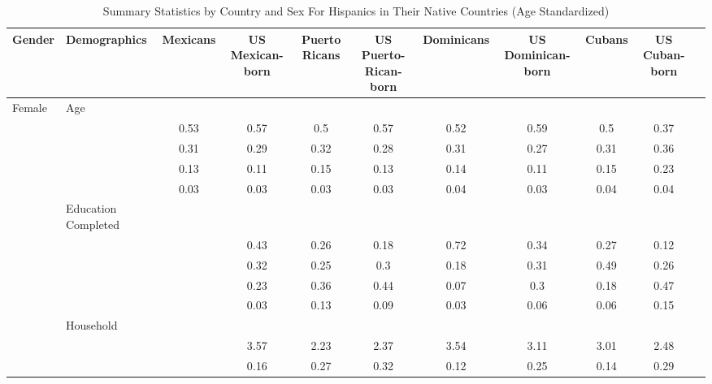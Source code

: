 \documentclass[
]{article}
\begin{document}
\begin{landscape}
\begin{table}[ht]
\centering
\caption{Summary Statistics by Country and Sex For Hispanics in Their Native Countries (Age Standardized)} 
\begingroup\small
\begin{tabular}{l>{\raggedright\arraybackslash}p{3.2cm}|ccccccccc}
  \hline
Gender & Demographics & Mexicans & US Mexican-born & Puerto Ricans & US Puerto-Rican-born & Dominicans & US Dominican-born & Cubans & US Cuban-born \\ 
  \hline
Female & Age &  &  &  &  &  &  &  &  \\ 
   & \multicolumn{1}{>{\raggedleft\arraybackslash}p{1.5cm}|}{\makebox[1.5cm][r]{60 - 69 }} & 0.53 & 0.57 & 0.5 & 0.57 & 0.52 & 0.59 & 0.5 & 0.37 \\ 
   & \multicolumn{1}{>{\raggedleft\arraybackslash}p{1.5cm}|}{\makebox[1.5cm][r]{70 - 79 }} & 0.31 & 0.29 & 0.32 & 0.28 & 0.31 & 0.27 & 0.31 & 0.36 \\ 
   & \multicolumn{1}{>{\raggedleft\arraybackslash}p{1.5cm}|}{\makebox[1.5cm][r]{80 - 89 }} & 0.13 & 0.11 & 0.15 & 0.13 & 0.14 & 0.11 & 0.15 & 0.23 \\ 
   & \multicolumn{1}{>{\raggedleft\arraybackslash}p{1.5cm}|}{\makebox[1.5cm][r]{90 plus }} & 0.03 & 0.03 & 0.03 & 0.03 & 0.04 & 0.03 & 0.04 & 0.04 \\ 
   & Education Completed &  &  &  &  &  &  &  &  \\ 
   & \multicolumn{1}{>{\raggedleft\arraybackslash}p{3.2cm}|}{\makebox[3.2cm][r]{Less than Primary }} &  & 0.43 & 0.26 & 0.18 & 0.72 & 0.34 & 0.27 & 0.12 \\ 
   & \multicolumn{1}{>{\raggedleft\arraybackslash}p{1.7cm}|}{\makebox[1.7cm][r]{Primary }} &  & 0.32 & 0.25 & 0.3 & 0.18 & 0.31 & 0.49 & 0.26 \\ 
   & \multicolumn{1}{>{\raggedleft\arraybackslash}p{2cm}|}{\makebox[2cm][r]{Secondary }} &  & 0.23 & 0.36 & 0.44 & 0.07 & 0.3 & 0.18 & 0.47 \\ 
   & \multicolumn{1}{>{\raggedleft\arraybackslash}p{2cm}|}{\makebox[2cm][r]{University }} &  & 0.03 & 0.13 & 0.09 & 0.03 & 0.06 & 0.06 & 0.15 \\ 
   & Household &  &  &  &  &  &  &  &  \\ 
   & \multicolumn{1}{>{\raggedleft\arraybackslash}p{2.7cm}|}{\makebox[2.7cm][r]{Household Size }} &  & 3.57 & 2.23 & 2.37 & 3.54 & 3.11 & 3.01 & 2.48 \\ 
   & \multicolumn{1}{>{\raggedleft\arraybackslash}p{2.2cm}|}{\makebox[2.2cm][r]{Lives Alone }} &  & 0.16 & 0.27 & 0.32 & 0.12 & 0.25 & 0.14 & 0.29 \\ 

\end{tabular}
\end{table}
\end{landscape}
\end{document}
